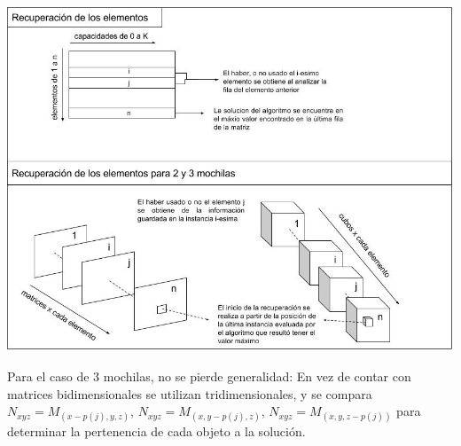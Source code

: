   \vspace*{0.3cm} \vspace*{0.3cm}
  \begin{center}
 \includegraphics[scale=0.6]{./EJ3/dibujo-recuperacion.jpg}
  \end{center}
  \vspace*{0.3cm}

 Para el caso de 3 mochilas, no se pierde generalidad: En vez de contar con matrices bidimensionales se utilizan tridimensionales, y se compara $N_{xyz} = M_{(x-p(j),y,z)}$, $N_{xyz} = M_{(x,y-p(j),z)}$, $N_{xyz} = M_{(x,y,z-p(j))}$ para determinar la pertenencia de cada objeto a la solución.
 